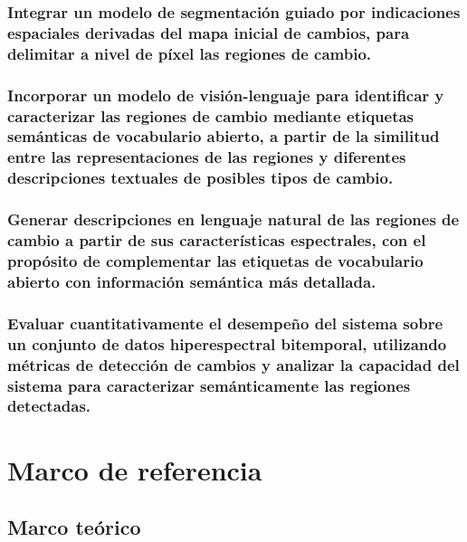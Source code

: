 \documentclass[12pt,onecolumn]{IEEEtran}
\begin{document}
    \subsubsection{\normalfont Integrar un modelo de segmentación guiado por indicaciones espaciales derivadas del mapa inicial de cambios, para delimitar a nivel de píxel las regiones de cambio.}

    \subsubsection{\normalfont Incorporar un modelo de visión-lenguaje para identificar y caracterizar las regiones de cambio mediante etiquetas semánticas de vocabulario abierto, a partir de la similitud entre las representaciones de las regiones y diferentes descripciones textuales de posibles tipos de cambio.}

    \subsubsection{\normalfont Generar descripciones en lenguaje natural de las regiones de cambio a partir de sus características espectrales, con el propósito de complementar las etiquetas de vocabulario abierto con información semántica más detallada.}

    \subsubsection{\normalfont Evaluar cuantitativamente el desempeño del sistema sobre un conjunto de datos hiperespectral bitemporal, utilizando métricas de detección de cambios y analizar la capacidad del sistema para caracterizar semánticamente las regiones detectadas.}
\vspace{1.5em}

\newpage
\section{Marco de referencia}
\subsection{Marco teórico}
\end{document}
